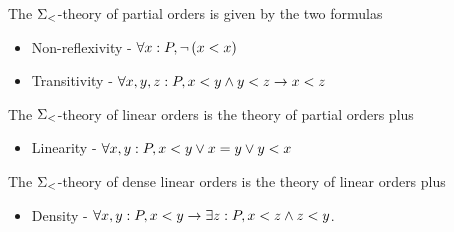 \begin{dfn}
    The $\Sigma_<$-theory of partial orders is given by the two formulas 
    \begin{itemize}
        \item Non-reflexivity - $\forall x : P, \neg\, (x < x)$
        \item Transitivity - $\forall x,y,z : P, x < y \land y < z \to x < z$
    \end{itemize}
    The $\Sigma_<$-theory of linear orders is the theory of partial orders plus 
    \begin{itemize}
        \item Linearity - $\forall x,y : P, x < y \lor x = y \lor y < x$
    \end{itemize}
    The $\Sigma_<$-theory of dense linear orders 
    is the theory of linear orders plus
    \begin{itemize}
        \item Density -
            $\forall x, y : P, x < y \to \exists z : P, x < z \land z < y$.
    \end{itemize}
\end{dfn}